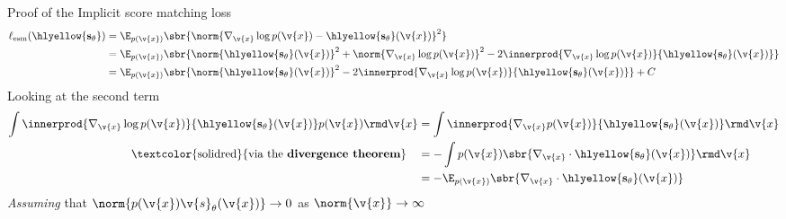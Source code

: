 \begin{frame}{Proof of the Implicit score matching loss}
    \begin{align*}
        \ell_{\mathrm{esm}}(\hlyellow{\mathbf{s}_\theta}) &= \E_{p(\v{x})}\sbr{\norm{\nabla_{\v{x}} \log p(\v{x}) - \hlyellow{\mathbf{s}_\theta}(\v{x})}^2} \\
        &= \E_{p(\v{x})}\sbr{ \norm{\hlyellow{\mathbf{s}_\theta}(\v{x})}^2 + \norm{\nabla_{\v{x}}\log p(\v{x}) }^2 - 2\innerprod{\nabla_{\v{x}}\log p(\v{x})}{\hlyellow{\mathbf{s}_\theta}(\v{x})}} \\
        &= \E_{p(\v{x})}\sbr{ \norm{\hlyellow{\mathbf{s}_\theta}(\v{x})}^2  - 2\innerprod{\nabla_{\v{x}}\log p(\v{x})}{\hlyellow{\mathbf{s}_\theta}(\v{x})}} + C
    \end{align*}
    Looking at the second term
    \begin{align*}
        \int \innerprod{\nabla_{\v{x}}\log p(\v{x})}{\hlyellow{\mathbf{s}_\theta}(\v{x})} p(\v{x}) \rmd \v{x} &= \int  \innerprod{\nabla_{\v{x}} p(\v{x})}{\hlyellow{\mathbf{s}_\theta}(\v{x})}  \rmd \v{x} \\
        \text{\textcolor{solidred}{via the \textbf{divergence theorem}}} \quad &= -\int  p(\v{x}) \sbr{ \nabla_{\v{x}} \cdot \hlyellow{\mathbf{s}_\theta}(\v{x})}  \rmd \v{x} \\
        &= -\E_{p(\v{x})}\sbr{\nabla_{\v{x}} \cdot \hlyellow{\mathbf{s}_\theta}(\v{x})}
    \end{align*}
    \textit{Assuming} that $\norm{p(\v{x}) \v{s}_\theta(\v{x})} \to 0$ as $\norm{\v{x}}\to \infty$
\end{frame}

